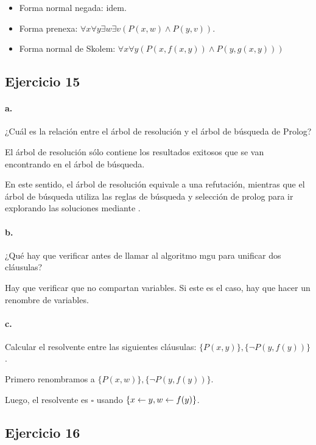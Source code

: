\begin{itemize}
  \item Forma normal negada: idem.
  \item Forma prenexa: $\forall x\forall y\exists w\exists v (P(x,w)\land P(y,v))$.
  \item Forma normal de Skolem: $\forall x\forall y (P(x,f(x,y))\land P(y,g(x,y)))$
\end{itemize}

\subsection*{Ejercicio 15}

\paragraph{a.} ¿Cuál es la relación entre el árbol de resolución y el árbol de búsqueda de Prolog?

El árbol de resolución sólo contiene los resultados exitosos que se van encontrando en el árbol de búsqueda.

En este sentido, el árbol de resolución equivale a una refutación, mientras que el árbol de búsqueda utiliza las reglas de búsqueda y selección de prolog para ir explorando las soluciones mediante .


\paragraph{b.} ¿Qué hay que verificar antes de llamar al algoritmo mgu para unificar dos cláusulas?

Hay que verificar que no compartan variables. Si este es el caso, hay que hacer un renombre de variables.


\paragraph{c.} Calcular el resolvente entre las siguientes cláusulas: $\{P (x, y)\}, \{\lnot P (y, f (y))\}$.

Primero renombramos a $\{P (x, w)\}, \{\lnot P (y, f (y))\}$.

Luego, el resolvente es $\square$ usando $\{x\leftarrow y, w\leftarrow f(y)\}$.

\subsection*{Ejercicio 16}

